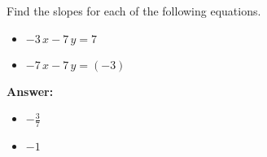  Find the slopes for each of the following equations. \begin{itemize}\item \( -3 \, x - 7 \, y = 7 \)\item \( -7 \, x - 7 \, y = \left(-3\right) \)\end{itemize}

        \textbf{Answer:} \begin{itemize}\item \( -\frac{3}{7} \)\item \( -1 \)\end{itemize}
